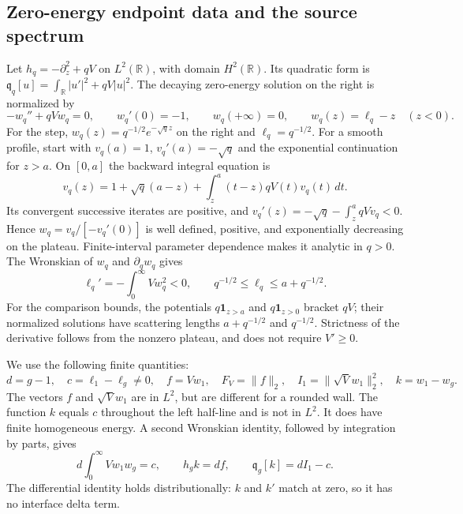\documentclass[aps,prl,reprint,superscriptaddress,longbibliography]{revtex4-2}
\begin{document}
\subsection{Zero-energy endpoint data and the source spectrum}
\label{sc:static-source}

Let $h_q=-\partial_z^2+qV$ on $L^2(\mathbb R)$, with domain
$H^2(\mathbb R)$. Its quadratic form is
$\mathfrak q_q[u]=\int_{\mathbb R}|u'|^2+qV|u|^2$.
The decaying zero-energy solution on the right is normalized by
\begin{equation}
 -w_q''+qVw_q=0,\qquad w_q'(0)=-1,\qquad
 w_q(+\infty)=0,
 \qquad w_q(z)=\ell_q-z\quad(z<0).
 \label{sc:zero-energy}
\end{equation}
For the step, $w_q(z)=q^{-1/2}e^{-\sqrt qz}$ on the right and
$\ell_q=q^{-1/2}$. For a smooth profile, start with
$v_q(a)=1$, $v_q'(a)=-\sqrt q$ and the exponential continuation for $z>a$.
On $[0,a]$ the backward integral equation is
\begin{equation}
 v_q(z)=1+\sqrt q(a-z)+\int_z^a(t-z)qV(t)v_q(t)\,dt.
 \label{sc:volterra}
\end{equation}
Its convergent successive iterates are positive, and
$v_q'(z)=-\sqrt q-\int_z^aqVv_q<0$. Hence
$w_q=v_q/[-v_q'(0)]$ is well defined, positive, and exponentially decreasing
on the plateau. Finite-interval parameter dependence makes it analytic
in $q>0$. The Wronskian of $w_q$ and $\partial_qw_q$ gives
\begin{equation}
 \ell_q'=-\int_0^\infty Vw_q^2<0,
 \qquad q^{-1/2}\le\ell_q\le a+q^{-1/2}.
 \label{sc:ell-monotonicity}
\end{equation}
For the comparison bounds, the potentials $q\mathbf1_{z>a}$ and
$q\mathbf1_{z>0}$ bracket $qV$; their normalized solutions have scattering
lengths $a+q^{-1/2}$ and $q^{-1/2}$. Strictness of the derivative follows
from the nonzero plateau, and does not require $V'\ge0$.

We use the following finite quantities:
\begin{equation}
 d=g-1,\quad c=\ell_1-\ell_g\ne0,\quad
 f=Vw_1,\quad F_V=\|f\|_2,\quad
 I_1=\|\sqrt Vw_1\|_2^2,\quad k=w_1-w_g.
 \label{sc:source-definitions}
\end{equation}
The vectors $f$ and $\sqrt Vw_1$ are in $L^2$, but are different for a
rounded wall. The function $k$ equals $c$ throughout the left half-line
and is not in $L^2$. It does have finite homogeneous energy. A second
Wronskian identity, followed by integration by parts, gives
\begin{equation}
 d\int_0^\infty Vw_1w_g=c,\qquad
 h_gk=df,\qquad
 \mathfrak q_g[k]=dI_1-c.
 \label{sc:static-affine}
\end{equation}
The differential identity holds distributionally: $k$ and $k'$ match at
zero, so it has no interface delta term.
\end{document}
